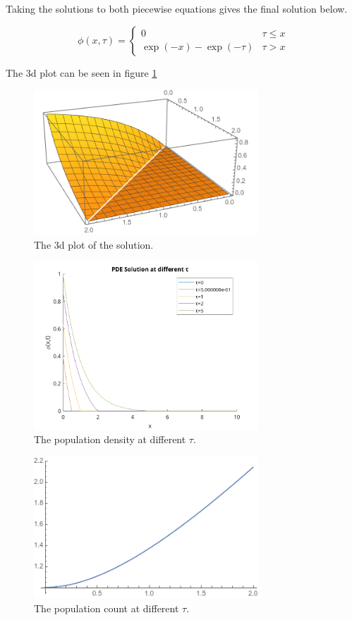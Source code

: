 \documentclass[paper=a4, fontsize=11pt]{scrartcl} %
\numberwithin{equation}{section} %
\numberwithin{figure}{section} %
\numberwithin{table}{section} %
\begin{document}
Taking the solutions to both piecewise equations gives the final solution below.

\[
	\phi(x,\tau) = \begin{cases} 
		0 						& \tau \le x \\
		\exp(-x)-\exp(-\tau) 	& \tau > x
   \end{cases}
\]

The 3d plot can be seen in figure \ref{prob3:3d}

\begin{figure}[H]\label{prob3:3d}
	\centering
	\includegraphics[width=0.75\textwidth]{bvp3}
	\caption{The 3d plot of the solution.}
\end{figure}

\begin{figure}[H]\label{prob2:tau}
	\centering
	\includegraphics[width=0.75\textwidth]{prob3}
	\caption{The population density at different $\tau$.}
\end{figure}

\begin{figure}[H]\label{prob2:tau}
	\centering
	\includegraphics[width=0.75\textwidth]{prob3-pop}
	\caption{The population count at different $\tau$.}
\end{figure}
\end{document}
